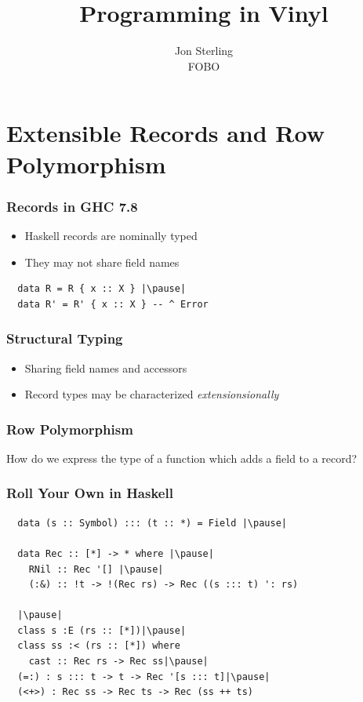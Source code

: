 \documentclass[12pt]{beamer}
\title{Programming in Vinyl}
\author{Jon Sterling\\
    FOBO
}
\begin{document}
\begin{frame}
\titlepage
\end{frame}

\section{Extensible Records and Row Polymorphism}

\begin{frame}[fragile]
  \frametitle{Records in GHC 7.8}\pause
  \begin{itemize}
    \item Haskell records are nominally typed\pause
    \item They may not share field names
  \end{itemize}
  \pause
  \begin{lstlisting}
  data R = R { x :: X } |\pause|
  data R' = R' { x :: X } -- ^ Error
  \end{lstlisting}
\end{frame}

\begin{frame}
  \frametitle{Structural Typing}\pause
  \begin{itemize}
    \item Sharing field names and accessors\pause
    \item Record types may be characterized \emph{extensionsionally}
  \end{itemize}
\end{frame}

\begin{frame}
  \frametitle{Row Polymorphism}\pause
  How do we express the type of a function which adds a field to a record?\pause
\end{frame}

\begin{frame}[fragile]
  \frametitle{Roll Your Own in Haskell}\pause
  \begin{lstlisting}
  data (s :: Symbol) ::: (t :: *) = Field |\pause|

  data Rec :: [*] -> * where |\pause|
    RNil :: Rec '[] |\pause|
    (:&) :: !t -> !(Rec rs) -> Rec ((s ::: t) ': rs)

  |\pause|
  class s :E (rs :: [*])|\pause|
  class ss :< (rs :: [*]) where
    cast :: Rec rs -> Rec ss|\pause|
  (=:) : s ::: t -> t -> Rec '[s ::: t]|\pause|
  (<+>) : Rec ss -> Rec ts -> Rec (ss ++ ts)
  \end{lstlisting}
\end{frame}
\end{document}
